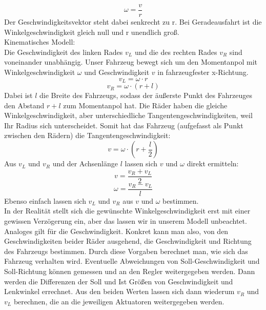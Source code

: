 \begin{equation}
\omega = \frac{v}{r}
\end{equation}
Der Geschwindigkeitsvektor steht dabei senkrecht zu r. Bei Ge­ra­de­aus­fahrt ist die Winkelgeschwindigkeit gleich null und r unendlich groß. \\
Kinematisches Modell: \\
Die Geschwindigkeit des linken Rades $v_{L}$ und die des rechten Rades $v_{R}$ sind voneinander unabhängig. Unser Fahrzeug bewegt sich um den Momentanpol mit Winkelgeschwindigkeit $\omega$ und Geschwindigkeit $v$ in fahrzeugfester x-Richtung.
\begin{equation}
v_{L} = \omega \cdot r
\end{equation}
\begin{equation}
v_{R} = \omega \cdot (r + l)
\end{equation}
Dabei ist $l$ die Breite des Fahrzeugs, sodass der äußerste Punkt des Fahrzeuges den Abstand $r + l$ zum Momentanpol hat. Die Räder haben die gleiche Winkelgeschwindigkeit, aber unterschiedliche Tangentengeschwindigkeiten, weil Ihr Radius sich unterscheidet. Somit hat das Fahrzeug (aufgefasst als Punkt zwischen den Rädern) die Tangentengeschwindigkeit:
\begin{equation}
v = \omega \cdot (r + \frac{l}{2})
\end{equation}
Aus $v_{L}$ und $v_{R}$ und der Achsenlänge $l$ lassen sich $v$ und $\omega$ direkt ermitteln: 
\begin{equation}
v = \frac{v_{R}+v_{L}}{2}
\end{equation}
\begin{equation}
\omega = \frac{v_{R}-v_{L}}{l}
\end{equation}
Ebenso einfach lassen sich $v_{L}$ und $v_{R}$ aus $v$ und $\omega$ bestimmen. \\
In der Realität stellt sich die gewünschte Winkelgeschwindigkeit erst mit einer gewissen Verzögerung ein, aber das lassen wir in unserem Modell unbeachtet. Analoges gilt für die Geschwindigkeit. Konkret kann man also, von den Geschwindigkeiten beider Räder ausgehend, die Geschwindigkeit und Richtung des Fahrzeugs bestimmen. Durch diese Vorgaben berechnet man, wie sich das Fahrzeug verhalten wird. Eventuelle Abweichungen von Soll-Geschwindigkeit und Soll-Richtung können gemessen und an den Regler weitergegeben werden. Dann werden die Differenzen der Soll und Ist Größen von Geschwindigkeit und Lenkwinkel errechnet. Aus den beiden Werten lassen sich dann wiederum $v_{R}$ und $v_{L}$ berechnen, die an die jeweiligen Aktuatoren weitergegeben werden.
